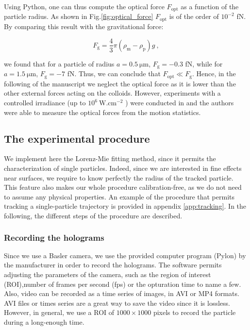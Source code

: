 Using Python, one can thus compute the optical force $F_\mathrm{opt}$ as a function of the particle radius. As shown in Fig.\ref{fig:optical_force}  $F_\mathrm{opt}$ is of the order of $10^{-2}$ fN. By comparing this result with the gravitational force:

\begin{equation}
	F_\mathrm{g} =  \frac{4}{3} \pi (\rho_\mathrm{m} - \rho_\mathrm{p}) g ~,
\end{equation}

we found that for a particle of radius $a = 0.5 ~\mathrm{\mu m}$, $F_\mathrm{g} = -0.3 $ fN, while for $a = 1.5 ~\mathrm{\mu m}$, $F_\mathrm{g} = -7 $ fN. Thus, we can conclude that $F_\mathrm{opt} \ll F_\mathrm{g}$. Hence, in the following of the manuscript we neglect the optical force as it is lower than the other external forces acting on the colloids. However,  experiments with a controlled irradiance (up to $10^6 ~\mathrm{W.cm^{-2}}$ )  were conducted in \cite{prieve_measurement_1999} and the authors were able to measure the optical forces from the motion statistics.






\subsection{The experimental procedure}
We implement here the Lorenz-Mie fitting method, since it permits the characterization of single particles. Indeed, since we are interested in fine effects near surfaces, we require to know perfectly the radius of the tracked particle. This feature also makes our whole procedure calibration-free, as we do not need to assume any physical properties. An example of the procedure that permits tracking a single-particle trajectory is provided in appendix \ref{app:tracking}. In the following, the different steps of the procedure are described.

\subsubsection{Recording the holograms}
Since we use a Basler camera, we use the provided computer program (Pylon) by the manufacturer in order to record the holograms. The software permits adjusting the parameters of the camera, such as the region of interest (\gls{ROI}),number of frames per second (\gls{fps}) or the opturation time to name a few. Also, video can be recorded as a time series of images, in AVI or MP4 formats. AVI files or times series are a great way to save the video since it is lossless. However, in general, we use a \gls{ROI} of $1000 \times 1000$ pixels to record the particle during a long-enough time. 


